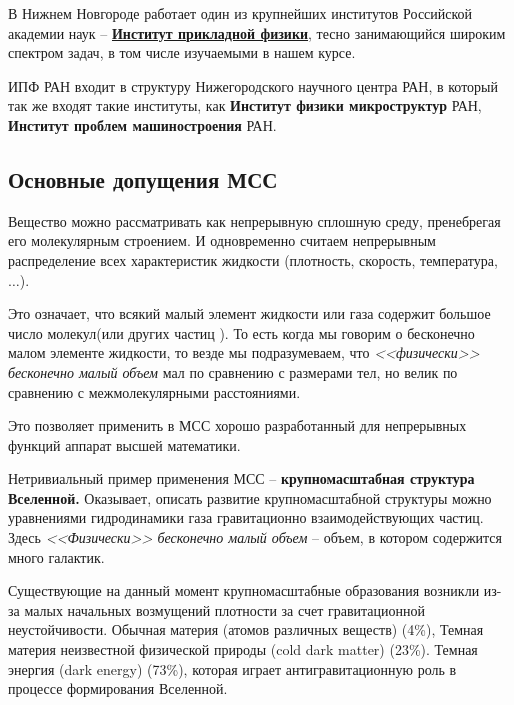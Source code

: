 В Нижнем Новгороде работает один из крупнейших институтов Российской академии наук -- \href{http://www.iapras.ru}{\textbf{Институт прикладной физики}}\footnotemark, тесно занимающийся широким спектром задач, в том числе изучаемыми в нашем курсе.

ИПФ РАН входит в структуру Нижегородского научного центра РАН, в который так же входят такие институты, как \textbf{Институт физики микроструктур} РАН, \textbf{Институт проблем машиностроения} РАН.



\newpage
\subsection{Основные допущения МСС}
Вещество можно рассматривать как непрерывную сплошную среду, пренебрегая его молекулярным строением. И одновременно считаем непрерывным распределение всех характеристик жидкости (плотность, скорость, температура, $\ldots$).

Это означает, что всякий малый элемент жидкости или газа содержит большое число молекул(или других частиц ). То есть когда мы говорим о бесконечно малом элементе жидкости, то везде мы подразумеваем,  что \textit{<<физически>> бесконечно малый объем} мал по сравнению с размерами тел, но велик по сравнению с межмолекулярными расстояниями.

Это позволяет применить в МСС хорошо разработанный для непрерывных функций аппарат высшей математики.

Нетривиальный пример применения МСС -- \textbf{крупномасштабная структура  Вселенной.} Оказывает, описать развитие крупномасштабной структуры можно уравнениями гидродинамики газа гравитационно взаимодействующих частиц. Здесь \emph{<<Физически>> бесконечно малый объем} -- объем, в котором содержится много галактик.

Существующие на данный момент крупномасштабные образования возникли из-за малых начальных возмущений плотности за счет гравитационной неустойчивости. Обычная материя (атомов различных веществ) (4\%), Темная материя неизвестной физической природы (cold dark matter) (23\%). Темная энергия (dark energy) (73\%), которая играет антигравитационную роль в процессе формирования Вселенной.

